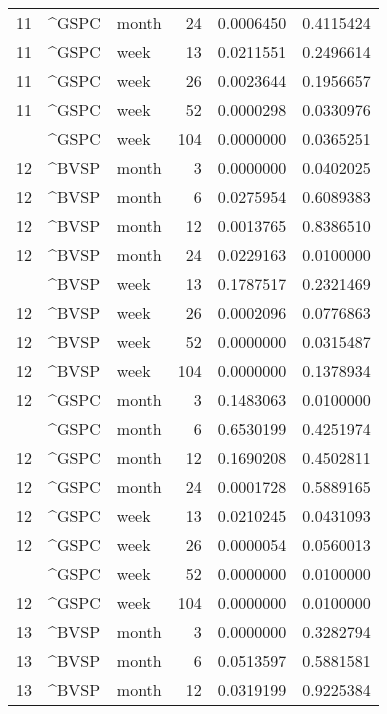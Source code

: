 \begin{tabular}{rllrrr}
11 & \textasciicircum{}GSPC & month & 24 & 0.0006450 & 0.4115424\\
11 & \textasciicircum{}GSPC & week & 13 & 0.0211551 & 0.2496614\\
11 & \textasciicircum{}GSPC & week & 26 & 0.0023644 & 0.1956657\\
11 & \textasciicircum{}GSPC & week & 52 & 0.0000298 & 0.0330976\\
\addlinespace
11 & \textasciicircum{}GSPC & week & 104 & 0.0000000 & 0.0365251\\
12 & \textasciicircum{}BVSP & month & 3 & 0.0000000 & 0.0402025\\
12 & \textasciicircum{}BVSP & month & 6 & 0.0275954 & 0.6089383\\
12 & \textasciicircum{}BVSP & month & 12 & 0.0013765 & 0.8386510\\
12 & \textasciicircum{}BVSP & month & 24 & 0.0229163 & 0.0100000\\
\addlinespace
12 & \textasciicircum{}BVSP & week & 13 & 0.1787517 & 0.2321469\\
12 & \textasciicircum{}BVSP & week & 26 & 0.0002096 & 0.0776863\\
12 & \textasciicircum{}BVSP & week & 52 & 0.0000000 & 0.0315487\\
12 & \textasciicircum{}BVSP & week & 104 & 0.0000000 & 0.1378934\\
12 & \textasciicircum{}GSPC & month & 3 & 0.1483063 & 0.0100000\\
\addlinespace
12 & \textasciicircum{}GSPC & month & 6 & 0.6530199 & 0.4251974\\
12 & \textasciicircum{}GSPC & month & 12 & 0.1690208 & 0.4502811\\
12 & \textasciicircum{}GSPC & month & 24 & 0.0001728 & 0.5889165\\
12 & \textasciicircum{}GSPC & week & 13 & 0.0210245 & 0.0431093\\
12 & \textasciicircum{}GSPC & week & 26 & 0.0000054 & 0.0560013\\
\addlinespace
12 & \textasciicircum{}GSPC & week & 52 & 0.0000000 & 0.0100000\\
12 & \textasciicircum{}GSPC & week & 104 & 0.0000000 & 0.0100000\\
13 & \textasciicircum{}BVSP & month & 3 & 0.0000000 & 0.3282794\\
13 & \textasciicircum{}BVSP & month & 6 & 0.0513597 & 0.5881581\\
13 & \textasciicircum{}BVSP & month & 12 & 0.0319199 & 0.9225384\\

\end{tabular}
